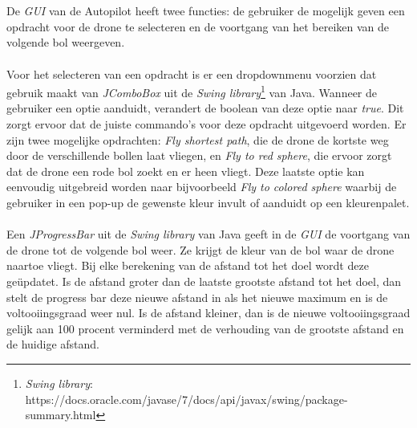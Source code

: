 \\
\\
De \textit{GUI} van de Autopilot heeft twee functies: de gebruiker de mogelijk geven een opdracht voor de drone te selecteren en de voortgang van het bereiken van de volgende bol weergeven.
\\
\\
Voor het selecteren van een opdracht is er een dropdownmenu voorzien dat gebruik maakt van \textit{JComboBox} uit de \textit{Swing library}\footnote{\textit{Swing library}: https://docs.oracle.com/javase/7/docs/api/javax/swing/package-summary.html} van Java. Wanneer de gebruiker een optie aanduidt, verandert de boolean van deze optie naar \textit{true}. Dit zorgt ervoor dat de juiste commando's voor deze opdracht uitgevoerd worden. Er zijn twee mogelijke opdrachten: \textit{Fly shortest path}, die de drone de kortste weg door de verschillende bollen laat vliegen, en \textit{Fly to red sphere}, die ervoor zorgt dat de drone een rode bol zoekt en er heen vliegt. Deze laatste optie kan eenvoudig uitgebreid worden naar bijvoorbeeld \textit{Fly to colored sphere} waarbij de gebruiker in een pop-up de gewenste kleur invult of aanduidt op een kleurenpalet. 
\\
\\
Een \textit{JProgressBar} uit de \textit{Swing library} van Java geeft in de \textit{GUI} de voortgang van de drone tot de volgende bol weer. Ze krijgt de kleur van de bol waar  de drone naartoe vliegt. Bij elke berekening van de afstand tot het doel wordt deze ge\"{u}pdatet. Is de afstand groter dan de laatste grootste afstand tot het doel, dan stelt de progress bar deze nieuwe afstand in als het nieuwe maximum en is de voltooiingsgraad weer nul. Is de afstand kleiner, dan is de nieuwe voltooiingsgraad gelijk aan 100 procent verminderd met de verhouding van de grootste afstand en de huidige afstand.  
